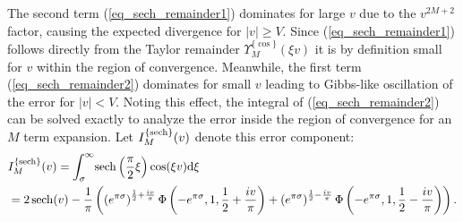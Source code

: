 The second term (\ref{eq_sech_remainder1}) dominates for
large $v$ due to the $v^{2M+2}$ factor, causing the expected divergence
for $|v| \geq V$.  Since (\ref{eq_sech_remainder1}) follows directly
from the Taylor remainder $\Upsilon_M^{\{\cos\}}(\xi v)$ it is by
definition small for $v$ within the region of convergence.
Meanwhile, the first term (\ref{eq_sech_remainder2})
dominates for small $v$ leading to Gibbs-like oscillation of the
error for $|v| < V$.  Noting this effect, the integral of
(\ref{eq_sech_remainder2}) can be solved exactly to analyze the
error inside the region of convergence for an $M$ term expansion.
Let $I_M^{\{\operatorname{sech}\}}(v)$ denote this error component:
\begin{gather}
	\begin{split}
		\label{eq_lerch_error_part_sech}
		&I_M^{\{\operatorname{sech}\}}(v) = \int_\sigma^{\infty} \!
		\operatorname{sech}\left(\frac{\pi}{2}\xi\right)
		\cos(\xi v) \mathrm{d}\xi \\
		&= 2 \operatorname{sech}(v)
		 - \frac{1}{\pi}\left(
		    \left( e^{\pi\sigma}\right)^{\frac{1}{2} + \frac{iv}{\pi}}
		    \Phi\left(-e^{\pi \sigma}, 1, \frac{1}{2} + \frac{iv}{\pi}\right)
		    +
		    \left( e^{\pi\sigma}\right)^{\frac{1}{2} - \frac{iv}{\pi}}
		    \Phi\left(-e^{\pi \sigma}, 1, \frac{1}{2} - \frac{iv}{\pi}\right)
		\right). \\
	\end{split}
\end{gather}

